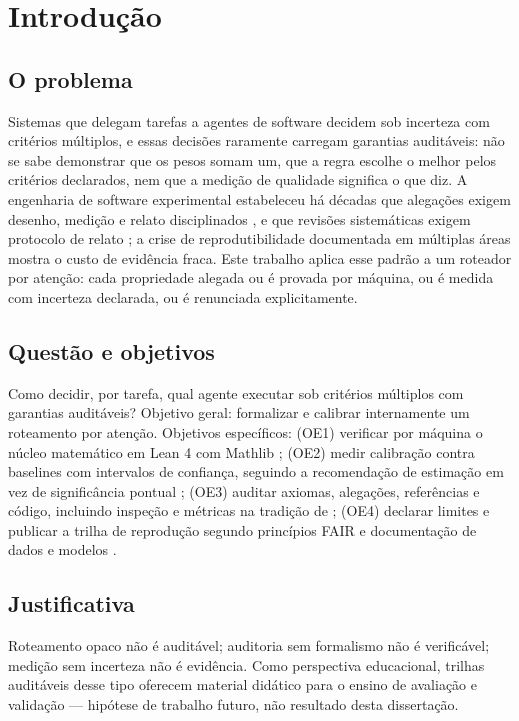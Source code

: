 \chapter{Introdução}
\section{O problema}
Sistemas que delegam tarefas a agentes de software decidem sob incerteza com critérios múltiplos, e essas decisões raramente carregam garantias auditáveis: não se sabe demonstrar que os pesos somam um, que a regra escolhe o melhor pelos critérios declarados, nem que a medição de qualidade significa o que diz. A engenharia de software experimental estabeleceu há décadas que alegações exigem desenho, medição e relato disciplinados \cite{basili1986,wohlin2012,runeson2009}, e que revisões sistemáticas exigem protocolo de relato \cite{page2021}; a crise de reprodutibilidade documentada em múltiplas áreas \cite{osc2015,ioannidis2005,collberg2016} mostra o custo de evidência fraca. Este trabalho aplica esse padrão a um roteador por atenção: cada propriedade alegada ou é provada por máquina, ou é medida com incerteza declarada, ou é renunciada explicitamente.
\section{Questão e objetivos}
Como decidir, por tarefa, qual agente executar sob critérios múltiplos com garantias auditáveis? Objetivo geral: formalizar e calibrar internamente um roteamento por atenção. Objetivos específicos: (OE1) verificar por máquina o núcleo matemático em Lean 4 com Mathlib \cite{moura2021,mathlib2020}; (OE2) medir calibração contra baselines com intervalos de confiança, seguindo a recomendação de estimação em vez de significância pontual \cite{cumming2014,wasserstein2016}; (OE3) auditar axiomas, alegações, referências e código, incluindo inspeção e métricas na tradição de \cite{fagan1976,mccabe1976,chidamber1994}; (OE4) declarar limites e publicar a trilha de reprodução segundo princípios FAIR \cite{wilkinson2016} e documentação de dados e modelos \cite{gebru2021,mitchell2019}.
\section{Justificativa}
Roteamento opaco não é auditável; auditoria sem formalismo não é verificável; medição sem incerteza não é evidência. Como perspectiva educacional, trilhas auditáveis desse tipo oferecem material didático para o ensino de avaliação e validação --- hipótese de trabalho futuro, não resultado desta dissertação.
